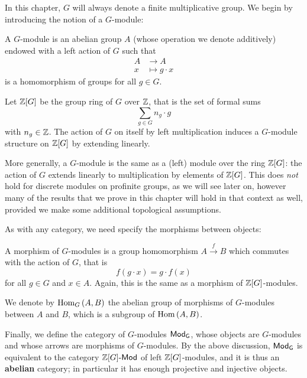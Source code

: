\documentclass[a4paper, oneside]{memoir}
\begin{document}
In this chapter, $G$ will always denote a finite multiplicative group. We begin by introducing the notion of a $G$-module:

\begin{definition}
    A $G$-module is an abelian group $A$ (whose operation we denote additively) endowed with a left action of $G$ such that
    \begin{align*}
        A & \longrightarrow A    \\
        x & \longmapsto g\cdot x
    \end{align*}
    is a homomorphism of groups for all $g\in G$.
\end{definition}

\begin{remark}
    Let $\mathbb{Z}[G]$ be the group ring of $G$ over $\mathbb{Z}$, that is the set of formal sums
    \[
        \sum_{g\in G}{n_g\cdot g}
    \]
    with $n_g\in\mathbb{Z}$. The action of $G$ on itself by left multiplication induces a $G$-module structure on $\mathbb{Z}[G]$ by extending linearly.

    More generally, a $G$-module is the same as a (left) module over the ring $\mathbb{Z}[G]$: the action of $G$ extends linearly to multiplication by elements of $\mathbb{Z}[G]$. This does \textit{not} hold for discrete modules on profinite groups, as we will see later on, however many of the results that we prove in this chapter will hold in that context as well, provided we make some additional topological assumptions.
\end{remark}

As with any category, we need specify the morphisms between objects:

\begin{definition}
    A morphism of $G$-modules is a group homomorphism $A\overset{f}{\to} B$ which commutes with the action of $G$, that is
    \[
        f(g\cdot x)=g\cdot f(x)
    \]
    for all $g\in G$ and $x\in A$. Again, this is the same as a morphism of $\mathbb{Z}[G]$-modules.
\end{definition}
\noindent We denote by $\operatorname{Hom}_G{(A,B)}$ the abelian group of morphisms of $G$-modules between $A$ and $B$, which is a subgroup of $\operatorname{Hom}{(A,B)}$.

\medskip Finally, we define the category of $G$-modules $\mathsf{Mod}_\mathsf{G}$, whose objects are $G$-modules and whose arrows are morphisms of $G$-modules. By the above discussion, $\mathsf{Mod}_\mathsf{G}$ is equivalent to the category $\mathbb{Z}[G]\text{-}\mathsf{Mod}$ of left $\mathbb{Z}[G]$-modules, and it is thus an \textbf{abelian} category; in particular it has enough projective and injective objects.
\end{document}
